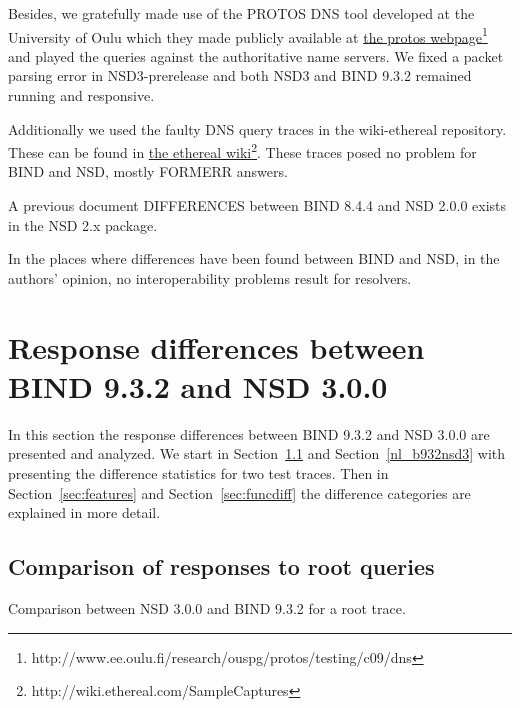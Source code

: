 \documentclass[twoside,titlepage,english]{nlnetlabs}
\begin{document}
Besides, we gratefully made use of the PROTOS DNS tool developed 
at the University of Oulu which they made publicly available at 
\href{http://www.ee.oulu.fi/research/ouspg/protos/testing/c09/dns}
{the protos webpage}\footnote{http://www.ee.oulu.fi/research/ouspg/protos/testing/c09/dns}
and played the queries against the authoritative name servers.
We fixed a packet parsing error in NSD3-prerelease and both NSD3 and
BIND 9.3.2 remained running and responsive.

Additionally we used the faulty DNS query traces in the wiki-ethereal
repository. These can be found in \href{http://wiki.ethereal.com/SampleCaptures}
{the ethereal wiki}\footnote{http://wiki.ethereal.com/SampleCaptures}.
These traces posed no problem for BIND and NSD, mostly FORMERR answers.

A previous document DIFFERENCES between BIND 8.4.4 and NSD 2.0.0 exists
in the NSD 2.x package.

In the places where differences have been found between BIND and NSD,
in the authors' opinion, no interoperability problems result for resolvers.


\section{Response differences between BIND 9.3.2 and NSD 3.0.0}

In this section the response differences between BIND 9.3.2 and NSD 3.0.0
are presented and analyzed. We start in Section~\ref{root_b932nsd3} and 
Section~\ref{nl_b932nsd3} with presenting
the difference statistics for two test traces. Then in 
Section~\ref{sec:features} and Section~\ref{sec:funcdiff}
the difference categories are explained in more detail.


\subsection{Comparison of responses to root queries}
\label{root_b932nsd3}

Comparison between NSD 3.0.0 and BIND 9.3.2 for a root trace.
\end{document}
